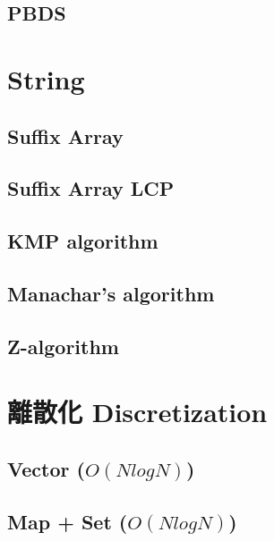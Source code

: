     \subsection{PBDS}
        


\section{String}
    \subsection{Suffix Array}
        
    \subsection{Suffix Array LCP}
        
    \subsection{KMP algorithm}
        
    \subsection{Manachar's algorithm}
        
    \subsection{Z-algorithm}
        

\section{離散化 Discretization}
    \subsection{Vector ($O(NlogN)$)}
        
    \subsection{Map + Set ($O(NlogN)$)}
        
